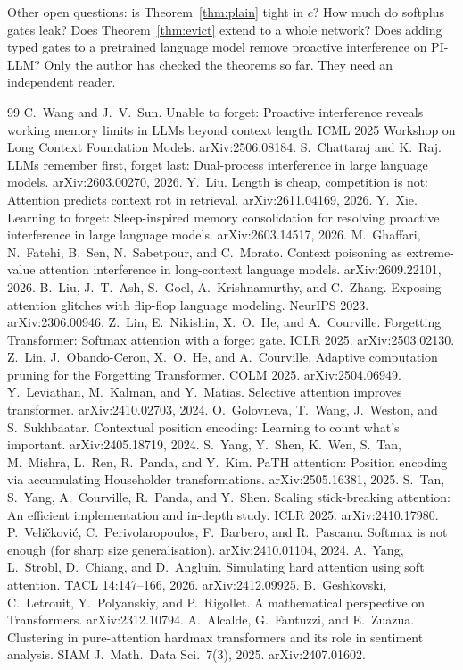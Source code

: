 \documentclass[10pt]{article}
\theoremstyle{definition}
\theoremstyle{remark}
\begin{document}
Other open questions: is Theorem~\ref{thm:plain} tight in $c$? How much do softplus gates leak? Does Theorem~\ref{thm:evict} extend to a whole network? Does adding typed gates to a pretrained language model remove proactive interference on PI-LLM? Only the author has checked the theorems so far. They need an independent reader.

\begin{thebibliography}{99}\small
{} C.~Wang and J.~V.~Sun. Unable to forget: Proactive interference reveals working memory limits in LLMs beyond context length. ICML 2025 Workshop on Long Context Foundation Models. arXiv:2506.08184.
 S.~Chattaraj and K.~Raj. LLMs remember first, forget last: Dual-process interference in large language models. arXiv:2603.00270, 2026.
 Y.~Liu. Length is cheap, competition is not: Attention predicts context rot in retrieval. arXiv:2611.04169, 2026.
 Y.~Xie. Learning to forget: Sleep-inspired memory consolidation for resolving proactive interference in large language models. arXiv:2603.14517, 2026.
 M.~Ghaffari, N.~Fatehi, B.~Sen, N.~Sabetpour, and C.~Morato. Context poisoning as extreme-value attention interference in long-context language models. arXiv:2609.22101, 2026.
 B.~Liu, J.~T.~Ash, S.~Goel, A.~Krishnamurthy, and C.~Zhang. Exposing attention glitches with flip-flop language modeling. NeurIPS 2023. arXiv:2306.00946.
 Z.~Lin, E.~Nikishin, X.~O.~He, and A.~Courville. Forgetting Transformer: Softmax attention with a forget gate. ICLR 2025. arXiv:2503.02130.
 Z.~Lin, J.~Obando-Ceron, X.~O.~He, and A.~Courville. Adaptive computation pruning for the Forgetting Transformer. COLM 2025. arXiv:2504.06949.
 Y.~Leviathan, M.~Kalman, and Y.~Matias. Selective attention improves transformer. arXiv:2410.02703, 2024.
 O.~Golovneva, T.~Wang, J.~Weston, and S.~Sukhbaatar. Contextual position encoding: Learning to count what's important. arXiv:2405.18719, 2024.
 S.~Yang, Y.~Shen, K.~Wen, S.~Tan, M.~Mishra, L.~Ren, R.~Panda, and Y.~Kim. PaTH attention: Position encoding via accumulating Householder transformations. arXiv:2505.16381, 2025.
 S.~Tan, S.~Yang, A.~Courville, R.~Panda, and Y.~Shen. Scaling stick-breaking attention: An efficient implementation and in-depth study. ICLR 2025. arXiv:2410.17980.
 P.~Veli\v{c}kovi\'c, C.~Perivolaropoulos, F.~Barbero, and R.~Pascanu. Softmax is not enough (for sharp size generalisation). arXiv:2410.01104, 2024.
 A.~Yang, L.~Strobl, D.~Chiang, and D.~Angluin. Simulating hard attention using soft attention. TACL 14:147--166, 2026. arXiv:2412.09925.
 B.~Geshkovski, C.~Letrouit, Y.~Polyanskiy, and P.~Rigollet. A mathematical perspective on Transformers. arXiv:2312.10794.
 A.~Alcalde, G.~Fantuzzi, and E.~Zuazua. Clustering in pure-attention hardmax transformers and its role in sentiment analysis. SIAM J.\ Math.\ Data Sci.\ 7(3), 2025. arXiv:2407.01602.
\end{thebibliography}
\end{document}
